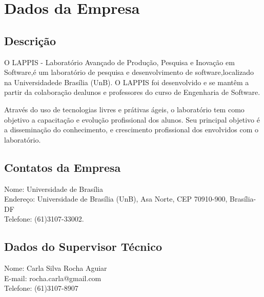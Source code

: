 \chapter[Dados da Empresa]{Dados da Empresa}

\section{Descrição}

O LAPPIS - Laboratório Avançado de Produção, Pesquisa e Inovação em Software,é um laboratório de pesquisa e desenvolvimento de software,localizado na Universidadede Brasília (UnB). O LAPPIS foi desenvolvido e se mantêm a partir da colaboração dealunos e professores do curso de Engenharia de Software.

Através do uso de tecnologias livres e prátivas ágeis, o laboratório tem como objetivo a capacitação e evolução profissional dos alunos. Seu principal objetivo é a disseminação do conhecimento, e crescimento profissional dos envolvidos com o laboratório.

\section{Contatos da Empresa}
Nome: Universidade de Brasília  \\
Endereço: Universidade de Brasília (UnB), Asa Norte, CEP 70910-900, Brasília-DF  \\
Telefone: (61)3107-33002.  \\

\section{Dados do Supervisor Técnico}
Nome: Carla Silva Rocha Aguiar \\
E-mail: rocha.carla@gmail.com \\
Telefone: (61)3107-8907 \\

